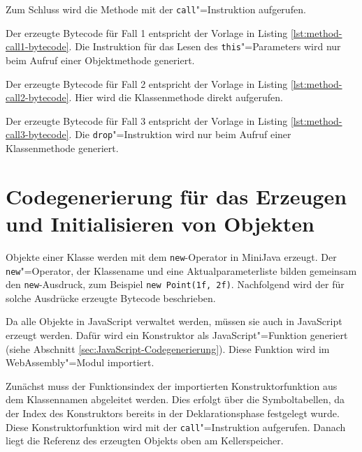 Zum Schluss wird die Methode mit der \lstinline{call}"=Instruktion aufgerufen.

Der erzeugte Bytecode für Fall 1 entspricht der Vorlage in Listing \ref{lst:method-call1-bytecode}. Die Instruktion für das Lesen des \lstinline{this}"=Parameters wird nur beim Aufruf einer Objektmethode generiert. 



Der erzeugte Bytecode für Fall 2 entspricht der Vorlage in Listing \ref{lst:method-call2-bytecode}. Hier wird die Klassenmethode direkt aufgerufen. 



Der erzeugte Bytecode für Fall 3 entspricht der Vorlage in Listing \ref{lst:method-call3-bytecode}. Die \lstinline{drop}"=Instruktion wird nur beim Aufruf einer Klassenmethode generiert.



\pagebreak
\section{Codegenerierung für das Erzeugen und Initialisieren von Objekten}
\label{sec:Codegenerierung-für-das-Erzeugen-und-Initialisieren-von-Objekten}
Objekte einer Klasse werden mit dem \lstinline{new}-Operator in MiniJava erzeugt. Der \lstinline{new}"=Operator, der Klassename und eine Aktualparameterliste bilden gemeinsam den \lstinline{new}-Ausdruck, zum Beispiel \lstinline{new Point(1f, 2f)}. Nachfolgend wird der für solche Ausdrücke erzeugte Bytecode beschrieben.

Da alle Objekte in JavaScript verwaltet werden, müssen sie auch in JavaScript erzeugt werden. Dafür wird ein Konstruktor als JavaScript"=Funktion generiert (siehe Abschnitt \ref{sec:JavaScript-Codegenerierung}). Diese Funktion wird im WebAssembly"=Modul importiert.

Zunächst muss der Funktionsindex der importierten Konstruktorfunktion aus dem Klassennamen abgeleitet werden. Dies erfolgt über die Symboltabellen, da der Index des Konstruktors bereits in der Deklarationsphase festgelegt wurde. Diese Konstruktorfunktion wird mit der \lstinline{call}"=Instruktion aufgerufen. Danach liegt die Referenz des erzeugten Objekts oben am Kellerspeicher.


